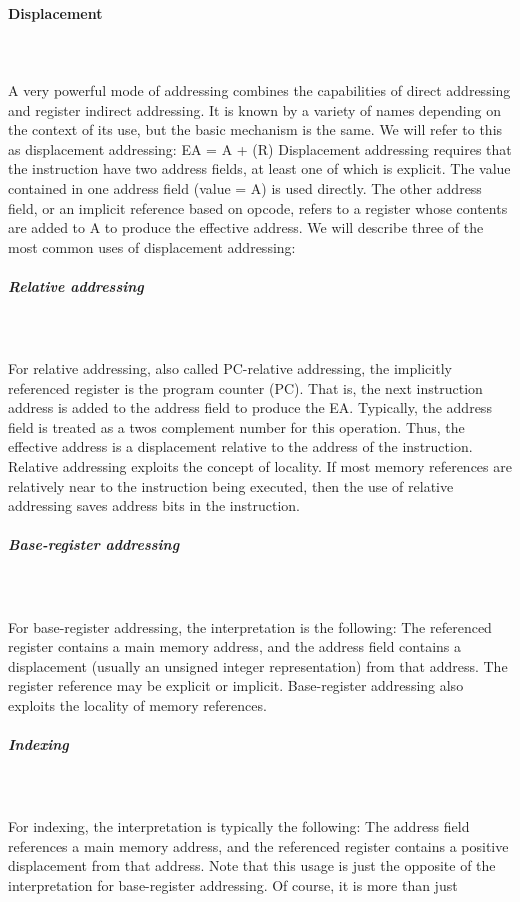 \paragraph{Displacement}\mbox{}\\\\%
A very powerful mode of addressing combines the capabilities of direct addressing
and register indirect addressing. It is known by a variety of names depending on
the context of its use, but the basic mechanism is the same. We will refer to this as
displacement addressing:
EA = A + (R)
Displacement addressing requires that the instruction have two address fields, at
least one of which is explicit. The value contained in one address field (value = A)
is used directly. The other address field, or an implicit reference based on opcode,
refers to a register whose contents are added to A to produce the effective address.
We will describe three of the most common uses of displacement addressing:
\subparagraph{Relative addressing}\mbox{}\\\\%
For relative addressing, also called PC-relative addressing,
	the implicitly referenced register is the program counter (PC). That is, the next
	instruction address is added to the address field to produce the EA. Typically, the
	address field is treated as a twos complement number for this operation. Thus, the
	effective address is a displacement relative to the address of the instruction.
	Relative addressing exploits the concept of locality. If most memory references are relatively near to the instruction being executed, then the use of relative addressing saves address bits in the instruction.
\subparagraph{Base-register addressing}\mbox{}\\\\%
For base-register addressing, the interpretation is
	the following: The referenced register contains a main memory address, and the
	address field contains a displacement (usually an unsigned integer representation)
	from that address. The register reference may be explicit or implicit.
	Base-register addressing also exploits the locality of memory references.
\subparagraph{Indexing}\mbox{}\\\\%
For indexing, the interpretation is typically the following: The address
	field references a main memory address, and the referenced register contains a
	positive displacement from that address. Note that this usage is just the opposite
	of the interpretation for base-register addressing. Of course, it is more than just
